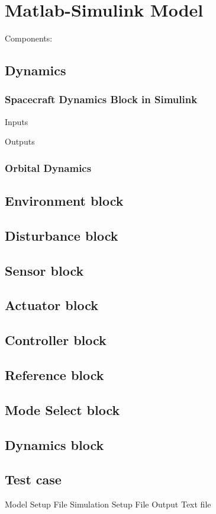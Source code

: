 
\section{Matlab-Simulink Model}
Components:

\subsection{Dynamics}
\subsubsection{Spacecraft Dynamics Block in Simulink} %
Inputs

Outputs

\subsubsection{Orbital Dynamics} %
\subsection{Environment block} %
\subsection{Disturbance block} %
\subsection{Sensor block} %
\subsection{Actuator block} %
\subsection{Controller block} %
\subsection{Reference block} %
\subsection{Mode Select block} %
\subsection{Dynamics block}
\subsection{Test case}
Model Setup File
Simulation Setup File
Output Text file

